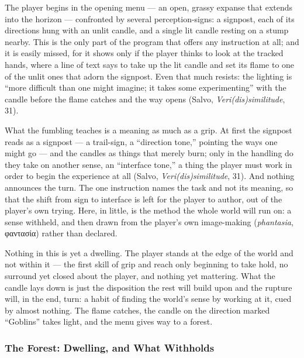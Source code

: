 \documentclass{article}
\newcommand{\gk}[1]{{\greekfont #1}}
\begin{document}
The player begins in the opening menu — an open, grassy expanse that extends into the horizon — confronted by several perception-signs: a signpost, each of its directions hung with an unlit candle, and a single lit candle resting on a stump nearby. This is the only part of the program that offers any instruction at all; and it is easily missed, for it shows only if the player thinks to look at the tracked hands, where a line of text says to take up the lit candle and set its flame to one of the unlit ones that adorn the signpost. Even that much resists: the lighting is ``more difficult than one might imagine; it takes some experimenting'' with the candle before the flame catches and the way opens (Salvo, \textit{Veri(dis)similitude}, 31).

What the fumbling teaches is a meaning as much as a grip. At first the signpost reads as a signpost — a trail-sign, a ``direction tone,'' pointing the ways one might go — and the candles as things that merely burn; only in the handling do they take on another sense, an ``interface tone,'' a thing the player must work in order to begin the experience at all (Salvo, \textit{Veri(dis)similitude}, 31). And nothing announces the turn. The one instruction names the task and not its meaning, so that the shift from sign to interface is left for the player to author, out of the player's own trying. Here, in little, is the method the whole world will run on: a sense withheld, and then drawn from the player's own image-making (\textit{phantasia}, \gk{φαντασία}) rather than declared.

Nothing in this is yet a dwelling. The player stands at the edge of the world and not within it — the first skill of grip and reach only beginning to take hold, no surround yet closed about the player, and nothing yet mattering. What the candle lays down is just the disposition the rest will build upon and the rupture will, in the end, turn: a habit of finding the world's sense by working at it, cued by almost nothing. The flame catches, the candle on the direction marked ``Goblins'' takes light, and the menu gives way to a forest.

\subsubsection*{The Forest: Dwelling, and What Withholds}
\end{document}
